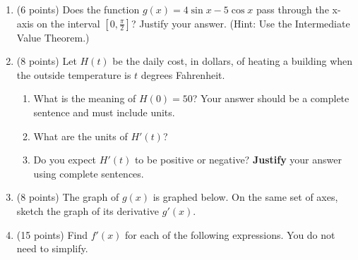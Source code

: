\documentclass[12pt]{article}
\begin{document}
\begin{enumerate}
\item (6 points) Does the function $g(x)=4\sin x - 5\cos x$ pass through the x-axis on the interval $[0,\frac{\pi}{2}]$? Justify your answer. (Hint: Use the Intermediate Value Theorem.)

\vfill
\newpage


\item (8 points) Let $H(t)$ be the daily cost, in dollars, of heating a building when the outside temperature is $t$ degrees Fahrenheit.

	\begin{enumerate}

	\item What is the meaning of $H(0)=50$? Your answer should be a complete sentence and must include units.

	\vspace{.6in}

	\item What are the units of $H'(t)$?
	\vspace{.5in}

	\item Do you expect $H'(t)$ to be positive or negative? \textbf{Justify} your answer using complete sentences. 
\vfill
	\end{enumerate}


\item (8 points) The graph of $g(x)$ is graphed below. On the same set of axes, sketch the graph of its derivative $g'(x)$.

\begin{center}
 \end{center}

\newpage

\item (15 points) Find $f'(x)$ for each of the following expressions. You do not need to simplify.


\end{enumerate}
\end{document}
